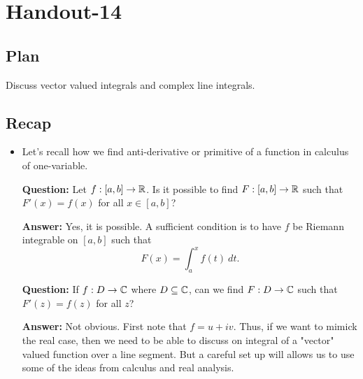 \documentclass[a4paper]{article}
\begin{document}
\section{Handout-14}

\subsection{Plan}

Discuss vector valued integrals and complex line integrals.

\subsection{Recap}

\begin{itemize}
    \item Let's recall how we find anti-derivative or primitive of a function in calculus of one-variable.

\textbf{Question:} Let \( f: [a,b] \to \mathbb{R}  \). Is it possible to find \( F : [a,b] \to \mathbb{R}  \) such that \( F'(x) = f(x)  \) for all \( x \in [a,b] \)?

\textbf{Answer:} Yes, it is possible. A sufficient condition is to have \( f  \) be Riemann integrable on \( [a,b] \) such that 
\[  F(x) = \int_{ a }^{ x }  f(t) \ dt. \]

    \textbf{Question:} If \( f: D \to \mathbb{C}  \) where \( D \subseteq \mathbb{C}  \), can we find \( F: D \to \mathbb{C}  \) such that \( F'(z) = f(z)  \) for all \( z  \)?

    \textbf{Answer:} Not obvious. First note that \( f = u + iv \). Thus, if we want to mimick the real case, then we need to be able to discuss on integral of a "vector" valued function over a line segment. But a careful set up will allows us to use some of the ideas from calculus and real analysis.


\end{itemize}
\end{document}
